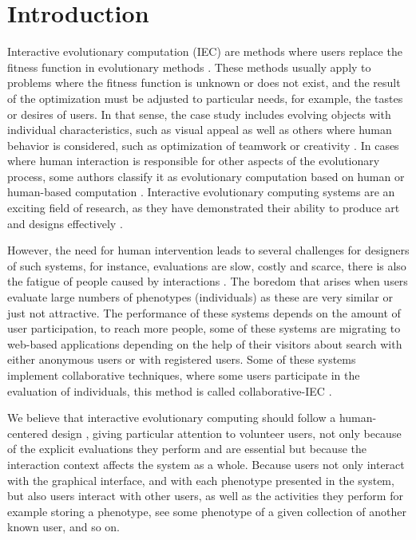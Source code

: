 \chapter{Introduction} \label{introduction}


\par Interactive evolutionary computation (IEC) are methods where users replace the
fitness function in evolutionary methods \cite{eiben2015introduction}.
These methods usually apply to problems
where the fitness function is unknown or does not exist, and the result of the
optimization must be adjusted to particular needs, for example, the tastes or
desires of users. In that sense, the case study includes evolving objects
with individual characteristics, such as visual appeal as well as others where
human behavior is considered, such as optimization of teamwork
\cite{kosorukoff2002evolutionary} or creativity \cite{yu2011cooks}. In cases
where human interaction is  responsible for other aspects of the evolutionary
process, some authors classify it as evolutionary computation based on human
\cite{kosorukoff2001human} or human-based computation \cite{quinn2011human}.
Interactive evolutionary computing systems are an exciting field of research, as
they have demonstrated their ability to produce art and designs effectively
\cite{bentley1999introduction}\cite{kowaliw2012promoting}\cite{sims1991artificial}\cite{todd1994evolutionary}.

\par However, the need for human intervention leads to several challenges for
designers of such systems, for instance, evaluations are slow, costly and
scarce, there is also the fatigue of people caused by interactions
\cite{takagi1998interactive}. The boredom that arises when users evaluate large
numbers of phenotypes (individuals) as these are very similar or just not attractive. The
performance of these systems depends on the amount of user participation, to
reach more people, some of these systems are migrating to web-based applications
depending on the help of their visitors about search with either anonymous users
or with registered users. Some of these systems implement collaborative
techniques, where some users participate in the evaluation of individuals, this
method is called collaborative-IEC \cite{secretan2008picbreeder}\cite{seyama2016development}\cite{wagy2014collective}.

\par We believe that interactive evolutionary computing should follow a human-centered
design \cite{greenhouse2012human}, giving particular attention to volunteer
users, not only because of the explicit evaluations they perform and are
essential but because the interaction context affects the system as a whole.
Because users not only interact with the graphical interface, and with each
phenotype presented in the system, but also users interact with other users, as
well as the activities they perform for example storing a phenotype, see some
phenotype of a given collection of another known user, and so on.

